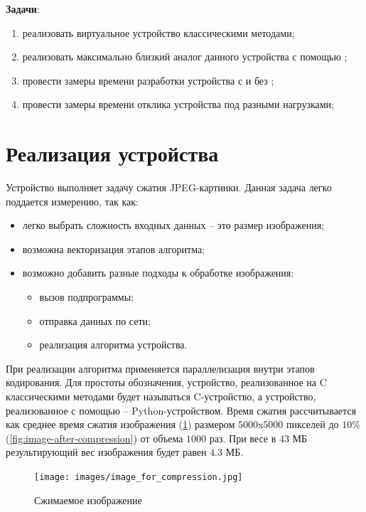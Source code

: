 \textbf{Задачи}:
\begin{enumerate}[label={\arabic*)}]
    \item реализовать виртуальное устройство классическими методами;
    \item реализовать максимально близкий аналог данного устройства с
        помощью {\mylanguage};
    \item провести замеры времени разработки устройства
        с и без {\mylanguage};
    \item провести замеры времени отклика устройства
        под разными нагрузками;
\end{enumerate}


\section{Реализация устройства}\label{sec:ch3/sec2}

Устройство выполняет задачу сжатия JPEG-картинки.
Данная задача легко поддается измерению, так как:
\begin{itemize}
    \item легко выбрать сложность входных данных -- это
        размер изображения;
    \item возможна векторизация этапов алгоритма;
    \item возможно добавить разные подходы к обработке
        изображения:
        \begin{itemize}
            \item вызов подпрограммы;
            \item отправка данных по сети;
            \item реализация алгоритма устройства.
        \end{itemize}
\end{itemize}

При реализации алгоритма применяется параллелизация внутри этапов кодирования.
Для простоты обозначения, устройство, реализованное на C классическими
методами будет называться C-устройство, а устройство, реализованное с помощью {\mylanguage} --
Python-устройством.
Время сжатия рассчитывается как среднее время сжатия изображения (\cref{fig:image-for-compression})
размером $5000$x$5000$ пикселей до $10\%$ (\cref{fig:image-after-compression}) от объема $1000$ раз.
При весе в $43$ МБ результирующий вес изображения будет равен $4.3$ МБ.


\begin{figure}[!htbp]
    \centering
    \begin{adjustbox}{max totalsize={0.8\textwidth}{\textheight}}
        \texttt{[image: images/image\_for\_compression.jpg]}
    \end{adjustbox}
    \caption{Сжимаемое изображение}\label{fig:image-for-compression}
\end{figure}

